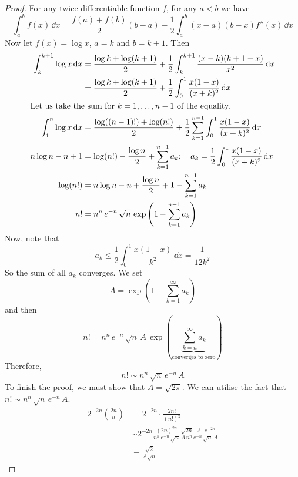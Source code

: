 \documentclass{article}
\begin{document}
\begin{proof}
    For any twice-differentiable function $f$, for any $a < b$ we have
    \[ \int_a^b f(x) \,\dd x = \frac{f(a) + f(b)}{2} (b - a) - \frac{1}{2}\int_a^b (x-a)(b-x)f''(x)\,\dd x \]
    Now let $f(x) = \log x$, $a=k$ and $b=k+1$. Then
    \begin{align*}
        \int_k^{k+1} \log x \,\dd x & = \frac{\log k + \log(k+1)}{2} + \frac{1}{2}\int_k^{k+1} \frac{(x-k)(k+1-x)}{x^2}\,\dd x                            \\
                                    & = \frac{\log k + \log(k+1)}{2} + \frac{1}{2}\int_0^1 \frac{x(1-x)}{(x+k)^2}\,\dd x                                  \\
        \intertext{Let us take the sum for $k=1, \dots, n-1$ of the equality.}
        \int_1^n \log x \,\dd x     & = \frac{\log ((n-1)!) + \log(n!)}{2} + \frac{1}{2}\sum_{k=1}^{n-1}\int_0^1 \frac{x(1-x)}{(x+k)^2}\,\dd x            \\
        n\log n - n + 1             & = \log (n!) - \frac{\log n}{2} + \sum_{k=1}^{n-1} a_k;\quad a_k = \frac{1}{2}\int_0^1 \frac{x(1-x)}{(x+k)^2}\,\dd x \\
        \log (n!)                   & = n \log n - n + \frac{\log n}{2} + 1 - \sum_{k=1}^{n-1} a_k                                                        \\
        n!                          & = n^n \, e^{-n} \, \sqrt n \, \exp\left( 1 - \sum_{k=1}^{n-1} a_k \right)
    \end{align*}
    Now, note that
    \[ a_k \leq \frac{1}{2}\int_0^1 \frac{x(1-x)}{k^2}\,\dd x = \frac{1}{12k^2} \]
    So the sum of all $a_k$ converges. We set
    \[ A = \exp\left( 1 - \sum_{k=1}^\infty a_k \right) \]
    and then
    \[ n! = n^n \, e^{-n} \, \sqrt n \, A \, \exp\left( \underbrace{\sum_{k=n}^\infty a_k}_{\text{converges to zero}} \right) \]
    Therefore,
    \[ n! \sim n^n\, \sqrt{n}\, e^{-n}\, A \]
    To finish the proof, we must show that $A = \sqrt{2 \pi}$. We can utilise the fact that $n! \sim n^n\, \sqrt{n}\, e^{-n}\, A$.
    \begin{align*}
        2^{-2n} \binom{2n}{n} & = 2^{-2n} \cdot \frac{2n!}{(n!)^2}                                                                                           \\
                              & \sim 2^{-2n} \frac{(2n)^{2n} \cdot \sqrt{2n} \cdot A \cdot e^{-2n}}{n^n\, e^{-n}\, \sqrt n\, A\, n^n\, e^{-n}\, \sqrt n\, A} \\
                              & = \frac{\sqrt{2}}{A\sqrt{n}}

\end{align*}
\end{proof}
\end{document}
